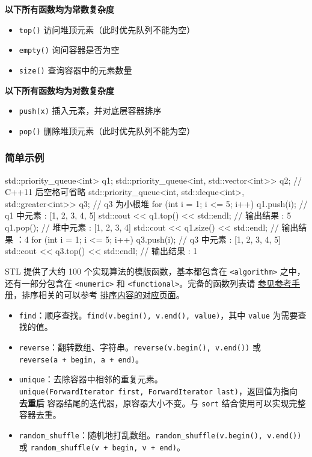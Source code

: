 \textbf{以下所有函数均为常数复杂度}

\begin{itemize}
\tightlist
\item
  \texttt{top()} 访问堆顶元素（此时优先队列不能为空）
\item
  \texttt{empty()} 询问容器是否为空
\item
  \texttt{size()} 查询容器中的元素数量
\end{itemize}

\textbf{以下所有函数均为对数复杂度}

\begin{itemize}
\tightlist
\item
  \texttt{push(x)} 插入元素，并对底层容器排序
\item
  \texttt{pop()} 删除堆顶元素（此时优先队列不能为空）
\end{itemize}

\subsubsection{简单示例}\label{ux7b80ux5355ux793aux4f8b-2}


\begin{codeline}
std::priority_queue<int> q1;
std::priority_queue<int, std::vector<int>> q2;
// C++11 后空格可省略
std::priority_queue<int, std::deque<int>, std::greater<int>> q3;
// q3 为小根堆
for (int i = 1; i <= 5; i++) q1.push(i);
// q1 中元素 :  [1, 2, 3, 4, 5]
std::cout << q1.top() << std::endl;
// 输出结果 : 5
q1.pop();
// 堆中元素 : [1, 2, 3, 4]
std::cout << q1.size() << std::endl;
// 输出结果 ：4
for (int i = 1; i <= 5; i++) q3.push(i);
// q3 中元素 :  [1, 2, 3, 4, 5]
std::cout << q3.top() << std::endl;
// 输出结果 : 1
\end{codeline}


STL 提供了大约 100 个实现算法的模版函数，基本都包含在 \texttt{\textless{}algorithm\textgreater{}} 之中，还有一部分包含在 \texttt{\textless{}numeric\textgreater{}} 和 \texttt{\textless{}functional\textgreater{}}。完备的函数列表请 \href{https://zh.cppreference.com/w/cpp/algorithm}{参见参考手册}，排序相关的可以参考 \href{../../basic/stl-sort.md}{排序内容的对应页面}。

\begin{itemize}
\item
  \texttt{find}：顺序查找。\texttt{find(v.begin(),\ v.end(),\ value)}，其中 \texttt{value} 为需要查找的值。
\item
  \texttt{reverse}：翻转数组、字符串。\texttt{reverse(v.begin(),\ v.end())} 或 \texttt{reverse(a\ +\ begin,\ a\ +\ end)}。
\item
  \texttt{unique}：去除容器中相邻的重复元素。\texttt{unique(ForwardIterator\ first,\ ForwardIterator\ last)}，返回值为指向 \textbf{去重后} 容器结尾的迭代器，原容器大小不变。与 \texttt{sort} 结合使用可以实现完整容器去重。
\item
  \texttt{random\_shuffle}：随机地打乱数组。\texttt{random\_shuffle(v.begin(),\ v.end())} 或 \texttt{random\_shuffle(v\ +\ begin,\ v\ +\ end)}。
\end{itemize}

